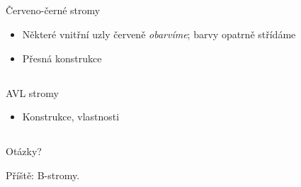 \documentclass{beamer}
\begin{document}
\subsection{}
\begin{frame}{Červeno-černé stromy}
\begin{itemize}
\item Některé vnitřní uzly červeně {\em obarvíme}; barvy opatrně střídáme
\item Přesná konstrukce
\end{itemize}
\end{frame}

\subsection{}
\begin{frame}{AVL stromy}
\begin{itemize}
\item Konstrukce, vlastnosti
\end{itemize}
\end{frame}

\subsection{}
\begin{frame}{Otázky?}
\begin{center}
Příště: B-stromy.
\end{center}
\end{frame}

\subsection{}
\end{document}
